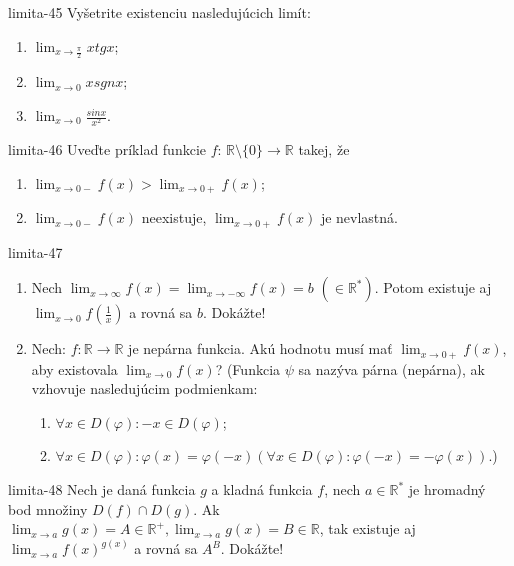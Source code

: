 \begin{defproblem}{limita-45}
Vyšetrite existenciu nasledujúcich limít:
\begin{enumerate}
\item $\lim_{x \rightarrow \frac{\pi}{2}} x tg x$;
\item $\lim_{x \rightarrow 0} x sgn x$;
\item $\lim_{x \rightarrow 0} \frac{sin x}{x^2}$.
\end{enumerate}
\end{defproblem}

\begin{defproblem}{limita-46}
Uveďte príklad funkcie $f$: $\mathbb{R} \setminus \{ 0\} \rightarrow \mathbb{R}$ takej, že
\begin{enumerate}
\item $\lim_{x \rightarrow 0-} f(x)>\lim_{x \rightarrow 0+} f(x)$;
\item $\lim_{x \rightarrow 0-} f(x)$ neexistuje, $\lim_{x \rightarrow 0+} f(x)$ je nevlastná.
\end{enumerate}
\end{defproblem}

\begin{defproblem}{limita-47}
\begin{enumerate}
\item Nech $\lim_{x \rightarrow \infty} f(x)=\lim_{x \rightarrow -\infty} f(x)=b$  $(\in \mathbb{R^*})$. Potom existuje aj $\lim_{x \rightarrow 0} f(\frac{1}{x})$  a rovná sa $b$. Dokážte!
\item Nech: $f: \mathbb{R} \rightarrow \mathbb{R}$ je nepárna funkcia. Akú hodnotu musí mať $\lim_{x \rightarrow 0+} f(x)$, aby existovala $\lim_{x \rightarrow 0} f(x)$? (Funkcia $\psi$ sa nazýva párna (nepárna), ak vzhovuje nasledujúcim podmienkam:
\begin{enumerate}
\item $\forall x \in D(\varphi): -x \in D(\varphi)$;
\item $\forall x \in D(\varphi): \varphi(x)=\varphi(-x) (\forall x \in D(\varphi): \varphi(-x)=-\varphi(x))$.)
\end{enumerate}
\end{enumerate}
\end{defproblem}

\begin{defproblem}{limita-48}
Nech je daná funkcia $g$ a kladná funkcia $f$, nech $a \in \mathbb{R^*}$ je hromadný bod množiny $D(f)\cap D(g)$. Ak $\lim_{x \rightarrow a} g(x)=A \in \mathbb{R^+},\lim_{x \rightarrow a} g(x)=B \in \mathbb{R}$, tak existuje aj $\lim_{x \rightarrow a} f(x)^{g(x)}$ a rovná sa $A^B$. Dokážte!
\end{defproblem}

